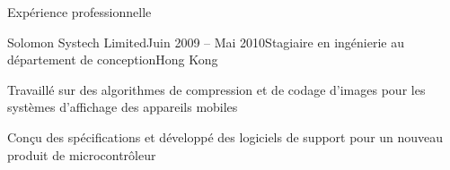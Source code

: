 \documentclass{resume} %
\begin{document}
\begin{rSection}{Expérience professionnelle}
	\begin{rSubsection}{Solomon Systech Limited}{Juin 2009 -- Mai 2010}{Stagiaire en ingénierie au département de conception}{Hong Kong}
		\item Travaillé sur des algorithmes de compression et de codage d'images pour les systèmes d'affichage des appareils mobiles
		\item Conçu des spécifications et développé des logiciels de support pour un nouveau produit de microcontrôleur
	\end{rSubsection}
\end{rSection}

\end{document}
